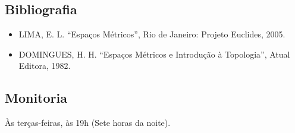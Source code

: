 \documentclass{article}
\begin{document}
\subsection{Bibliografia}
\begin{itemize}
	\item LIMA, E. L.  ``Espaços Métricos'', Rio de Janeiro: Projeto Euclides, 2005.
	\item DOMINGUES, H. H. ``Espaços Métricos e Introdução à Topologia'', Atual Editora, 1982.
\end{itemize}
\subsection*{Monitoria}
Às terças-feiras, às 19h (Sete horas da noite).

\newpage

\newpage

\newpage

\newpage

\newpage

\newpage

\newpage

\newpage

\newpage

\newpage

\newpage

\newpage

\newpage

\newpage

\newpage

\newpage

\newpage

\newpage

\end{document}
